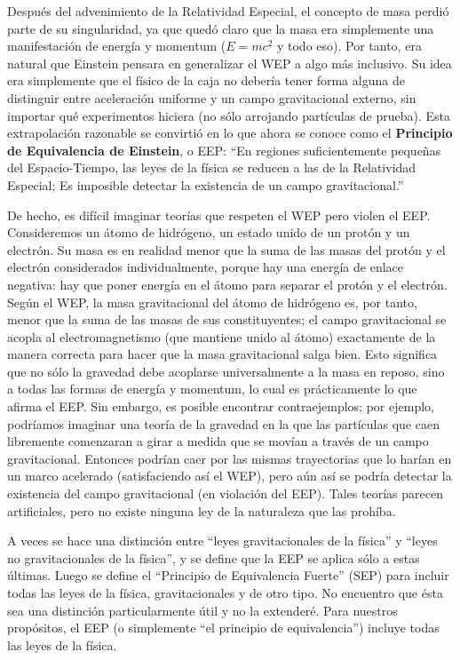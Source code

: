 \documentclass[11pt,b5paper,openany,twoside]{book}
\begin{document}
Después del advenimiento de la Relatividad Especial, el concepto de masa perdió parte de su singularidad, ya que quedó claro que la masa era simplemente una manifestación de energía y momentum ($E=mc^2$ y todo eso).
Por tanto, era natural que Einstein pensara en generalizar el WEP a algo más inclusivo.
Su idea era simplemente que el físico de la caja no debería tener forma alguna de distinguir entre aceleración uniforme y un campo gravitacional externo, sin importar qué experimentos hiciera (no sólo arrojando partículas de prueba).
Esta extrapolación razonable se convirtió en lo que ahora se conoce como el {\bf Principio de Equivalencia de Einstein}, o EEP: ``En regiones suficientemente pequeñas del Espacio-Tiempo, las leyes de la física se reducen a las de la Relatividad Especial; Es imposible detectar la existencia de un campo gravitacional.''

De hecho, es difícil imaginar teorías que respeten el WEP pero violen el EEP.
Consideremos un átomo de hidrógeno, un estado unido de un protón y un electrón.
Su masa es en realidad menor que la suma de las masas del protón y el electrón considerados individualmente, porque hay una energía de enlace negativa: hay que poner energía en el átomo para separar el protón y el electrón.
Según el WEP, la masa gravitacional del átomo de hidrógeno es, por tanto, menor que la suma de las masas de sus constituyentes; el campo gravitacional se acopla al electromagnetismo (que mantiene unido al átomo) exactamente de la manera correcta para hacer que la masa gravitacional salga bien.
Esto significa que no sólo la gravedad debe acoplarse universalmente a la masa en reposo, sino a todas las formas de energía y momentum, lo cual es prácticamente lo que afirma el EEP.
Sin embargo, es posible encontrar contraejemplos; por ejemplo, podríamos imaginar una teoría de la gravedad en la que las partículas que caen libremente comenzaran a girar a medida que se movían a través de un campo gravitacional.
Entonces podrían caer por las mismas trayectorias que lo harían en un marco acelerado (satisfaciendo así el WEP), pero aún así se podría detectar la existencia del campo gravitacional (en violación del EEP).
Tales teorías parecen artificiales, pero no existe ninguna ley de la naturaleza que las prohíba.

A veces se hace una distinción entre ``leyes gravitacionales de la física'' y ``leyes no gravitacionales de la física'', y se define que la EEP se aplica sólo a estas últimas.
Luego se define el ``Principio de Equivalencia Fuerte'' (SEP) para incluir todas las leyes de la física, gravitacionales y de otro tipo.
No encuentro que ésta sea una distinción particularmente útil y no la extenderé.
Para nuestros propósitos, el EEP (o simplemente ``el principio de equivalencia'') incluye todas las leyes de la física.
\end{document}
